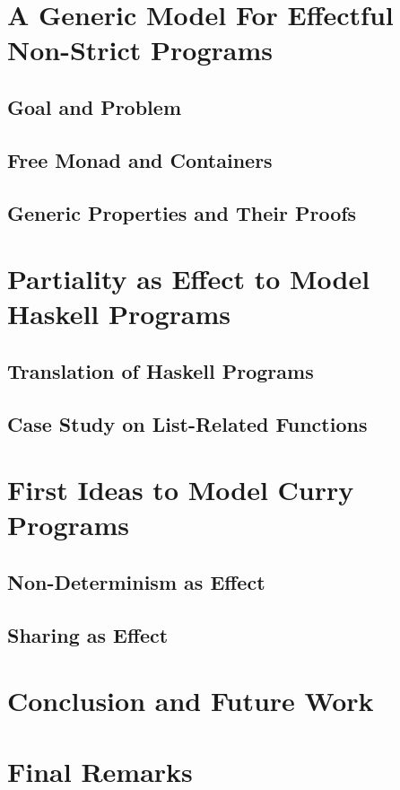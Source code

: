 \section{A Generic Model For Effectful Non-Strict Programs}
\subsection{Goal and Problem}
\subsection{Free Monad and Containers}
\subsection{Generic Properties and Their Proofs}
\section{Partiality as Effect to Model Haskell Programs}
\subsection{Translation of Haskell Programs}
\subsection{Case Study on List-Related Functions}
\section{First Ideas to Model Curry Programs}
\subsection{Non-Determinism as Effect}
\subsection{Sharing as Effect}
\section{Conclusion and Future Work}
\section{Final Remarks}
